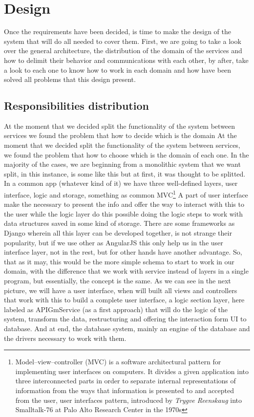 \chapter{Design}

Once the requirements have been decided, is time to make the design of the system
that will do all needed to cover them. First, we are going to take a look over
the general architecture, the distribution of the domain of the services and
how to delimit their behavior and communications with each other, by after,
take a look to each one to know how to work in each domain and how have been solved all problems
that this design present.

\section{Responsibilities distribution}

At the moment that we decided split the functionality of the system between
services we found the problem that how to decide which is the domain
\intro
At the moment that we decided split the functionality of the system between
services, we found the problem that how to choose which is the domain of each one.
In the majority of the cases, we are beginning from a monolithic system that we
want split, in this instance, is some like this but at first, it was thought to be splitted.
\intro
In a common app (whatever kind of it) we have three well-defined layers, user
interface, logic and storage, something as common MVC\footnote{Model–view–controller
(MVC) is a software architectural pattern for implementing user interfaces on
computers. It divides a given application into three interconnected parts in
order to separate internal representations of information from the ways that
information is presented to and accepted from the user, user interfaces pattern,
introduced by \textit{Trygve Reenskaug} into Smalltalk-76 at Palo Alto Research Center in the 1970s}
A part of user interface make the necessary to present the info and offer the
way to interact with this to the user while the logic layer do this possible
doing the logic steps to work with data structures saved in some kind of storage.
\intro
There are some frameworks as Django wherein all this layer can be developed
together, is not strange their popularity, but if we use other as AngularJS
this only help us in the user interface layer, not in the rest, but for other
hands have another advantage.
\intro
So, that as it may, this would be the more simple schema to start to work in
our domain, with the difference that we work with service instead of layers in a
single program, but essentially, the concept is the same.
\intro
As we can see in the next picture, we will have a user interface, when  will
built all views and controllers that work with this to build a complete user
interface, a logic section layer, here labeled as APIGmService (as a first
approach) that will do the logic of the system, transform the data,
restructuring and offering the interaction form UI to database.
And at end, the database system, mainly an engine of the database and the drivers
necessary to work with them.

